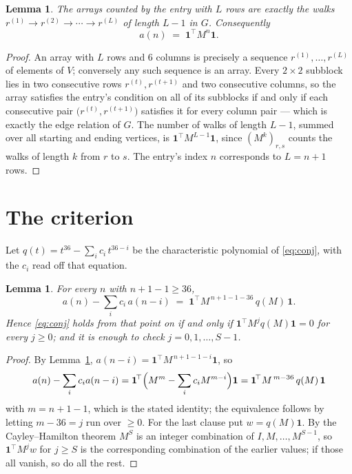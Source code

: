 \documentclass[11pt,a4paper]{article}
\theoremstyle{plain}
\newtheorem{lemma}[theorem]{Lemma}
\theoremstyle{definition}
\begin{document}
\begin{lemma}\label{lem:walk}
The arrays counted by the entry with $L$ rows are exactly the walks
$r^{(1)}\to r^{(2)}\to\cdots\to r^{(L)}$ of length $L-1$ in $G$. Consequently
\[
a(n)\;=\;\mathbf{1}^{\!\top}M^{n}\mathbf{1} .
\]
\end{lemma}

\begin{proof}
An array with $L$ rows and $6$ columns is precisely a sequence
$r^{(1)},\dots,r^{(L)}$ of elements of $V$; conversely any such sequence is an array.
Every $2\times2$ subblock lies in two consecutive rows $r^{(t)},r^{(t+1)}$ and two
consecutive columns, so the array satisfies the entry's condition on all of its subblocks
if and only if each consecutive pair $\bigl(r^{(t)},r^{(t+1)}\bigr)$ satisfies it for
every column pair --- which is exactly the edge relation of $G$. The number of walks of
length $L-1$, summed over all starting and ending vertices, is
$\mathbf{1}^{\!\top}M^{L-1}\mathbf{1}$, since $(M^{k})_{r,s}$ counts the walks of
length $k$ from $r$ to $s$. The entry's index $n$ corresponds to $L=n+1$ rows.
\end{proof}

\section{The criterion}

Let $q(t)=t^{36}-\sum_i c_i\,t^{36-i}$ be the characteristic polynomial of
\eqref{eq:conj}, with the $c_i$ read off that equation.

\begin{lemma}\label{lem:crit}
For every $n$ with $n+1-1\ge36$,
\[
a(n)-\sum_i c_i\,a(n-i)\;=\;\mathbf{1}^{\!\top}M^{\,n+1-1-36}\,q(M)\,\mathbf{1} .
\]
Hence \eqref{eq:conj} holds from that point on if and only if
$\mathbf{1}^{\!\top}M^{j}q(M)\mathbf{1}=0$ for every $j\ge0$; and it is enough to check
$j=0,1,\dots,S-1$.
\end{lemma}

\begin{proof}
By Lemma~\ref{lem:walk}, $a(n-i)=\mathbf{1}^{\!\top}M^{\,n+1-1-i}\mathbf{1}$, so
\[
a(n)-\sum_i c_i a(n-i)
=\mathbf{1}^{\!\top}\Bigl(M^{m}-\sum_i c_i M^{m-i}\Bigr)\mathbf{1}
=\mathbf{1}^{\!\top}M^{\,m-36}\,q(M)\,\mathbf{1}
\]
with $m=n+1-1$, which is the stated identity; the equivalence follows by letting
$m-36=j$ run over $\ge0$. For the last clause put $w=q(M)\mathbf{1}$. By the
Cayley--Hamilton theorem $M^{S}$ is an integer combination of $I,M,\dots,M^{S-1}$, so
$\mathbf{1}^{\!\top}M^{j}w$ for $j\ge S$ is the corresponding combination of the earlier
values; if those all vanish, so do all the rest.
\end{proof}
\end{document}
